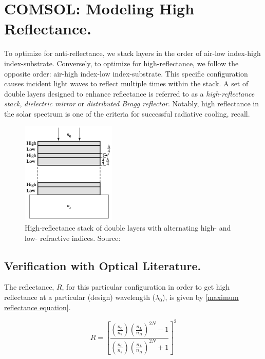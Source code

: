 \section{COMSOL: Modeling High Reflectance.}
To optimize for anti-reflectance, we stack layers in the order of air-low index-high index-substrate. Conversely, to optimize for high-reflectance, we follow the opposite order: air-high index-low index-substrate. This specific configuration causes incident light waves to reflect multiple times within the stack. A set of double layers designed to enhance reflectance is referred to as a \emph{high-reflectance stack}, \emph{dielectric mirror} or \emph{distributed Bragg reflector}. Notably, high reflectance in the solar spectrum is one of the criteria for successful radiative cooling, recall.

\begin{figure}[ht!]
  \centering
  \includegraphics[width=0.4\textwidth]{Chapters/Figures/Chapter 4 Figures/High-Reflectance Stack of Double Layers.png}
  \caption{High-reflectance stack of double layers with alternating high- and low- refractive indices. Source: \cite{pedrotti_introduction_2007}} 
  \label{fig:high-reflectance stack of alternating high and low refractive indices}
\end{figure}

\subsection{Verification with Optical Literature.}
The reflectance, $R$, for this particular configuration in order to get high reflectance at a particular (design) wavelength ($\lambda_0$), is given by \ref{maximum reflectance equation}.

\begin{equation}\label{maximum reflectance equation - chap4}
    R = \left[ \frac{ \left( \frac{n_0}{n_s} \right) \left( \frac{n_L}{n_H} \right)^{2N}  - 1 }{  \left( \frac{n_0}{n_s} \right) \left( \frac{n_L}{n_H} \right)^{2N}  + 1}  \right]^2
\end{equation}

